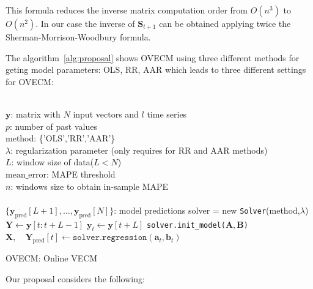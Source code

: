 \documentclass[twocolumn]{svjour3}          %
\begin{document}
This formula reduces the inverse matrix computation order from $O(n^3)$ to
$O(n^2)$. In our case the inverse of $\mathbf{S}_{t+1}$ can be obtained applying twice the Sherman-Morrison-Woodbury formula.





The algorithm~\ref{alg:proposal} shows OVECM using three different
methods for geting model parameters: OLS, RR, AAR which leads to three different
settings for OVECM:

\begin{algorithm}[ht]
\begin{algorithmic}[1]
\REQUIRE $\,$ \\
$\mathbf{y}$: matrix with $N$ input vectors and $l$ time series\\
$p$: number of past values \\
method: \{'OLS','RR','AAR'\} \\
$\lambda$: regularization parameter (only requires for RR and AAR methods) \\
$L$: window size of data($L<N$) \\
$\text{mean\_error}$: MAPE threshold \\
$n$: windows size to obtain in-sample MAPE \\
\ENSURE  $\,$ \\
$\{\mathbf{y}_{\text{pred}}[L+1],\dots, \mathbf{y}_{\text{pred}}[N]\}$: model predictions 
\STATE solver = new \texttt{Solver}(method,$\lambda$) \\
    \STATE $\mathbf{Y} \gets \mathbf{y}[t:t+L-1]$
    \STATE $\mathbf{y}_t \gets \mathbf{y}[t+L]$
        \STATE \texttt{solver.init\_model($\mathbf{A},\mathbf{B}$)} 
    \ENDIF
    \STATE $\mathbf{X} ,\quad \mathbf{Y}_{\text{pred}}[t] \gets \texttt{solver.regression}
    (\mathbf{a}_t,\mathbf{b}_t)$
\ENDFOR
\end{algorithmic}
\caption{OVECM: Online VECM}
\label{alg:proposal}
\end{algorithm}


Our proposal considers the following:
\end{document}
